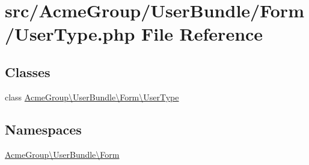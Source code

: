 \hypertarget{_user_type_8php}{\section{src/\+Acme\+Group/\+User\+Bundle/\+Form/\+User\+Type.php File Reference}
\label{_user_type_8php}
}
\subsection*{Classes}
\begin{DoxyCompactItemize}
\item 
class \hyperlink{class_acme_group_1_1_user_bundle_1_1_form_1_1_user_type}{Acme\+Group\textbackslash{}\+User\+Bundle\textbackslash{}\+Form\textbackslash{}\+User\+Type}
\end{DoxyCompactItemize}
\subsection*{Namespaces}
\begin{DoxyCompactItemize}
\item 
 \hyperlink{namespace_acme_group_1_1_user_bundle_1_1_form}{Acme\+Group\textbackslash{}\+User\+Bundle\textbackslash{}\+Form}
\end{DoxyCompactItemize}
